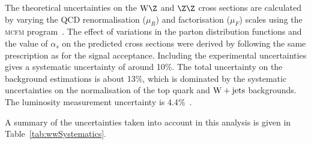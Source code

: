 The theoretical uncertainties on the $\WZ$ and $\ZZ$ cross sections are calculated 
by varying the QCD renormalisation ($\mu_R$) and factorisation ($\mu_F$) scales using 
the \textsc{mcfm} program~\cite{MCFM}. The effect of variations in the parton distribution 
functions and the value of $\alpha_{s}$ on the predicted cross sections were derived 
by following the same prescription as for the signal acceptance.
Including the experimental uncertainties gives a systematic uncertainty of around 10\%.
The total uncertainty on the background estimations is about 13\%, which is dominated by 
the systematic uncertainties on the normalisation of the top quark and $\mathrm{W+jets}$ 
backgrounds. The luminosity measurement uncertainty is $4.4\%$~\cite{lumiPAS}.

A summary of the uncertainties taken into account in this analysis is given in
Table~\ref{tab:wwSystematics}.

